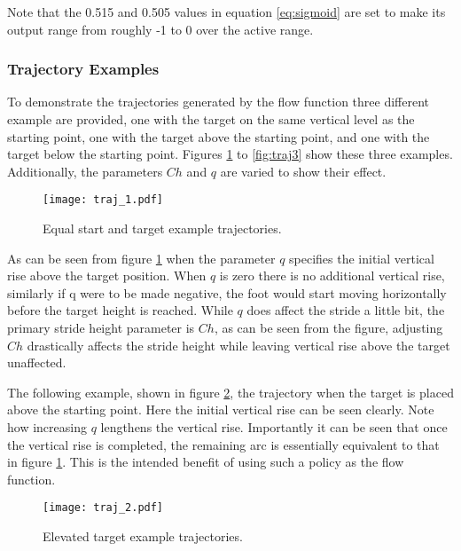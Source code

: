                 \noindent
                Note that the 0.515 and 0.505 values in equation \ref{eq:sigmoid} are set to make its output range from roughly -1 to 0 over the active range.
                
                \newpage
                \subsubsection{Trajectory Examples}
                To demonstrate the trajectories generated by the flow function three different example are provided, one with the target on the same vertical level as the starting point, one with the target above the starting point, and one with the target below the starting point. Figures \ref{fig:traj1} to \ref{fig:traj3} show these three examples. Additionally, the parameters \(Ch\) and \(q\) are varied to show their effect.
                \begin{figure}[h]
                    \centering
                    \texttt{[image: traj\_1.pdf]}
                    \caption{Equal start and target example trajectories.}
                    \label{fig:traj1}
                \end{figure}

                \noindent
                As can be seen from figure \ref{fig:traj1} when the parameter \(q\) specifies the initial vertical rise above the target position. When \(q\) is zero there is no additional vertical rise, similarly if q were to be made negative, the foot would start moving horizontally before the target height is reached. While \(q\) does affect the stride a little bit, the primary stride height parameter is \(Ch\), as can be seen from the figure, adjusting \(Ch\) drastically affects the stride height while leaving vertical rise above the target unaffected.

                The following example, shown in figure \ref{fig:traj2}, the trajectory when the target is placed above the starting point. Here the initial vertical rise can be seen clearly. Note how increasing \(q\) lengthens the vertical rise. Importantly it can be seen that once the vertical rise is completed, the remaining arc is essentially equivalent to that in figure \ref{fig:traj1}. This is the intended benefit of using such a policy as the flow function.
                
                \begin{figure}[h]
                    \centering
                    \texttt{[image: traj\_2.pdf]}
                    \caption{Elevated target example trajectories.}
                    \label{fig:traj2}
                \end{figure}


